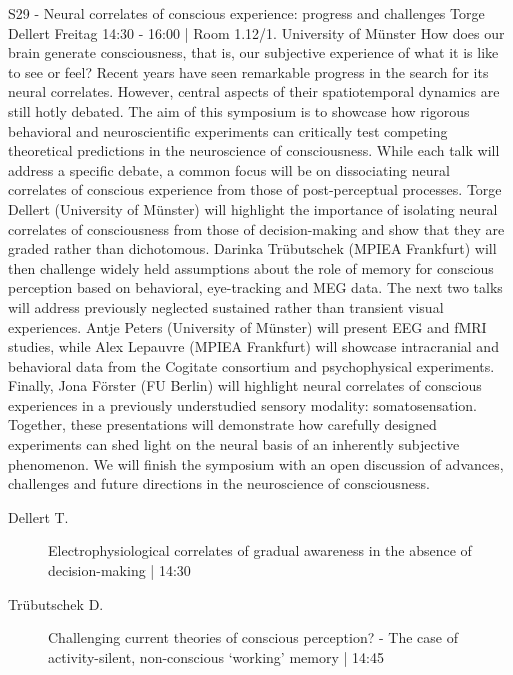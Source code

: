 
            \begin{symposium}
            {S29 - Neural correlates of conscious experience: progress and challenges}
            {Torge Dellert}
            {Freitag 14:30 - 16:00 | Room 1.12/1.}
            {University of Münster}
            How does our brain generate consciousness, that is, our subjective experience of what it is like to see or feel? Recent years have seen remarkable progress in the search for its neural correlates. However, central aspects of their spatiotemporal dynamics are still hotly debated. The aim of this symposium is to showcase how rigorous behavioral and neuroscientific experiments can critically test competing theoretical predictions in the neuroscience of consciousness. While each talk will address a specific debate, a common focus will be on dissociating neural correlates of conscious experience from those of post-perceptual processes.
Torge Dellert (University of Münster) will highlight the importance of isolating neural correlates of consciousness from those of decision-making and show that they are graded rather than dichotomous. Darinka Trübutschek (MPIEA Frankfurt) will then challenge widely held assumptions about the role of memory for conscious perception based on behavioral, eye-tracking and MEG data. The next two talks will address previously neglected sustained rather than transient visual experiences. Antje Peters (University of Münster) will present EEG and fMRI studies, while Alex Lepauvre (MPIEA Frankfurt) will showcase intracranial and behavioral data from the Cogitate consortium and psychophysical experiments. Finally, Jona Förster (FU Berlin) will highlight neural correlates of conscious experiences in a previously understudied sensory modality: somatosensation.
Together, these presentations will demonstrate how carefully designed experiments can shed light on the neural basis of an inherently subjective phenomenon. We will finish the symposium with an open discussion of advances, challenges and future directions in the neuroscience of consciousness.
            \begin{description}    
            
                \item [ Dellert T.] Electrophysiological correlates of gradual awareness in the absence of decision-making \textcolor{mygray}{ | 14:30}    
                
                \item [ Trübutschek D.] Challenging current theories of conscious perception? - The case of activity-silent, non-conscious ‘working’ memory \textcolor{mygray}{ | 14:45}    
                

\end{description}
\end{symposium}
